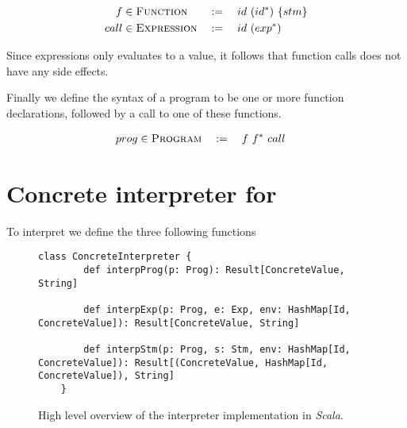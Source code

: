 \begin{alignat*}{3}
	f & \in \textsc{Function} && := \quad id \ (id^{*}) \ \{stm\}\\
	call & \in \textsc{Expression} && := \quad id \ (exp^{*})
\end{alignat*}

Since expressions only evaluates to a value, it follows that function calls does not have any side effects.

Finally we define the syntax of a \explanguage program to be one or more function declarations, followed by a call to one of these functions. 

\begin{alignat*}{3}
	prog & \in \textsc{Program} && := \quad f \ f^{*} \ call
\end{alignat*}

\section{Concrete interpreter for \explanguage}


\iffalse
\begin{figure}[!h]
	\begin{lstlisting}[style=simple]
		object ConcreteGrammar {
			sealed trait ConcreteValue
			object ConcreteValue {\\
				case class True() extends ConcreteValue
				case class False() extends ConcreteValue
				case class IntValue(v: Int) extends ConcreteValue
				case class UnitValue() extends ConcreteValue
			}
			sealed trait Exp
			sealed trait Stm
			case class Id(s: String)
			case class FDecl(name: Id, params: List[Id], stm: Stm)
			case class Prog(funcs: HashMap[String, FDecl], fCall: CallExp)	
		}
	\end{lstlisting}
	\caption{High level overview of grammar implementation in \textsl{Scala}.}
\end{figure}
\fi

To interpret \explanguage we define the three following functions

\begin{figure}[!h]
	\begin{lstlisting}[style=simple]
	class ConcreteInterpreter {
		def interpProg(p: Prog): Result[ConcreteValue, String]
			
		def interpExp(p: Prog, e: Exp, env: HashMap[Id, ConcreteValue]): Result[ConcreteValue, String]
						  
		def interpStm(p: Prog, s: Stm, env: HashMap[Id, ConcreteValue]): Result[(ConcreteValue, HashMap[Id, ConcreteValue]), String]
	}
	\end{lstlisting}
	\caption{High level overview of the interpreter implementation in \textsl{Scala}.}
\end{figure}

